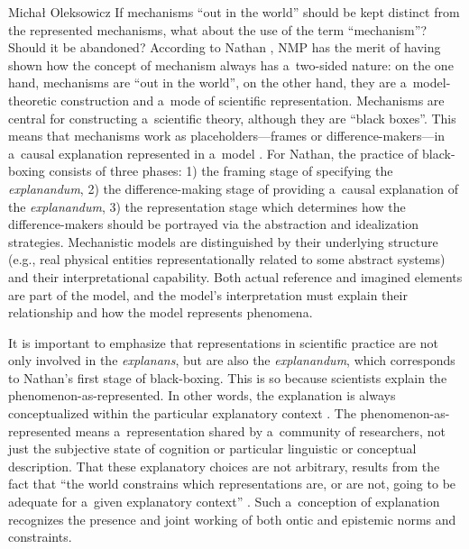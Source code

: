 \begin{artengenv}{Michał Oleksowicz}
If mechanisms ``out in the world'' should be kept distinct from the represented mechanisms, what about the use of the term ``mechanism''? Should it be abandoned? According to Nathan
\parencite*[][pp.162–190]{nathan_black_2021}, %
 NMP has the merit of having shown how the concept of mechanism always has a~two-sided nature: on the one hand, mechanisms are ``out in the world'', on the other hand, they are a~model-theoretic construction and a~mode of scientific representation. Mechanisms are central for constructing a~scientific theory, although they are ``black boxes''. This means that mechanisms work as placeholders---frames or difference-makers---in a~causal explanation represented in a~model 
\parencite[][p.133]{nathan_black_2021}. %
 For Nathan, the practice of black-boxing consists of three phases: 1) the framing stage of specifying the \textit{explanandum}, 2) the difference-making stage of providing a~causal explanation of the \textit{explanandum}, 3) the representation stage which determines how the difference-makers should be portrayed via the abstraction and idealization strategies. Mechanistic models are distinguished by their underlying structure (e.g., real physical entities representationally related to some abstract systems) and their interpretational capability. Both actual reference and imagined elements are part of the model, and the model's interpretation must explain their relationship and how the model represents phenomena.

It is important to emphasize that representations in scientific practice are not only involved in the \textit{explanans}, but are also the \textit{explanandum}, which corresponds to Nathan's first stage of black-boxing. This is so because scientists explain the phenomenon-as-represented. In other words, the explanation is always conceptualized within the particular explanatory context
\parencite[][]{bokulich_how_2011}. %
 The phenomenon-as-represented means a~representation shared by a~community of researchers, not just the subjective state of cognition or particular linguistic or conceptual description. That these explanatory choices are not arbitrary, results from the fact that ``the world constrains which representations are, or are not, going to be adequate for a~given explanatory context'' 
\parencite[][p.802]{bokulich_representing_2018}. %
 Such a~conception of explanation recognizes the presence and joint working of both ontic and epistemic norms and constraints.


\end{artengenv}
